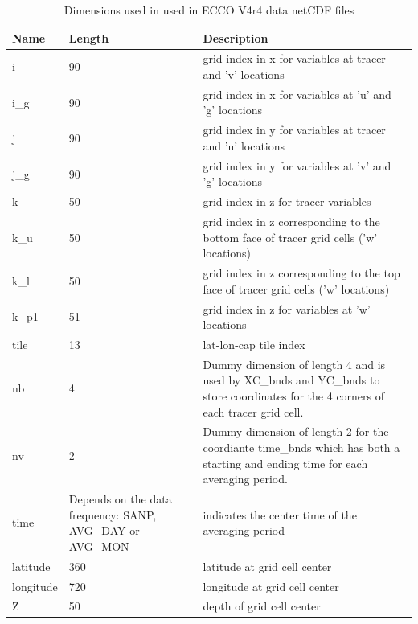 \begin{longtable}{|p{}|p{}|m{}|}
\caption{Dimensions used in used in ECCO V4r4 data netCDF files}
\label{tab:variable-attributes} \\ 
\hline \endfirsthead
\endhead
\endfoot
\hline \endlastfoot
\rowcolor{blue!25} \textbf{Name} & \textbf{Length} & \textbf{Description} \\ \hline
\rowcolor{magenta!25}
i & 90 & grid index in x for variables at tracer and 'v' locations \\ \hline
\rowcolor{magenta!25}
i\_g & 90 & grid index in x for variables at 'u' and 'g' locations \\ \hline
\rowcolor{magenta!25}
j & 90 & grid index in y for variables at tracer and 'u' locations \\ \hline
\rowcolor{magenta!25}
j\_g & 90 & grid index in y for variables at 'v' and 'g' locations \\ \hline
\rowcolor{magenta!25}
k & 50 & grid index in z for tracer variables \\ \hline
\rowcolor{magenta!25}
k\_u & 50 & grid index in z corresponding to the bottom face of tracer grid cells ('w' locations) \\ \hline
\rowcolor{magenta!25}
k\_l & 50 & grid index in z corresponding to the top face of tracer grid cells ('w' locations) \\ \hline
\rowcolor{magenta!25}
k\_p1 & 51 & grid index in z for variables at 'w' locations \\ \hline
\rowcolor{magenta!25}
tile & 13 & lat-lon-cap tile index \\ \hline
\rowcolor{magenta!25}
nb & 4 & Dummy dimension of length 4 and is used by XC\_bnds and YC\_bnds to store coordinates for the 4 corners of each tracer grid cell. \\ \hline
\rowcolor{magenta!25}
nv & 2 & Dummy dimension of length 2 for the coordiante time\_bnds which has both a starting and ending time for each averaging period. \\ \hline
\rowcolor{magenta!25}
time & Depends on the data frequency: SANP, AVG\_DAY or AVG\_MON & indicates the center time of the averaging period \\ \hline
\rowcolor{magenta!25}
latitude & 360 & latitude at grid cell center \\ \hline
\rowcolor{magenta!25}
longitude & 720 & longitude at grid cell center \\ \hline
\rowcolor{magenta!25}
Z & 50 & depth of grid cell center \\ \hline
\end{longtable}
